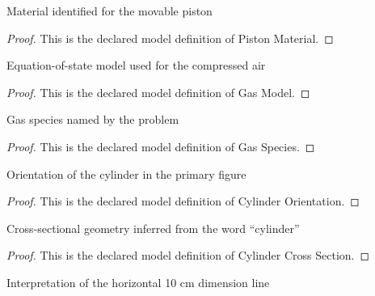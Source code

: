 \begin{definition}
  \label{def:physics:phyx-mini-0374:phyxminiproblems-problemphyxmini0374-pistonmaterial}
  Material identified for the movable piston
\end{definition}
\begin{proof}
  This is the declared model definition of Piston Material.
\end{proof}
\begin{definition}
  \label{def:physics:phyx-mini-0374:phyxminiproblems-problemphyxmini0374-gasmodel}
  Equation-of-state model used for the compressed air
\end{definition}
\begin{proof}
  This is the declared model definition of Gas Model.
\end{proof}
\begin{definition}
  \label{def:physics:phyx-mini-0374:phyxminiproblems-problemphyxmini0374-gasspecies}
  Gas species named by the problem
\end{definition}
\begin{proof}
  This is the declared model definition of Gas Species.
\end{proof}
\begin{definition}
  \label{def:physics:phyx-mini-0374:phyxminiproblems-problemphyxmini0374-cylinderorientation}
  Orientation of the cylinder in the primary figure
\end{definition}
\begin{proof}
  This is the declared model definition of Cylinder Orientation.
\end{proof}
\begin{definition}
  \label{def:physics:phyx-mini-0374:phyxminiproblems-problemphyxmini0374-cylindercrosssection}
  Cross-sectional geometry inferred from the word “cylinder”
\end{definition}
\begin{proof}
  This is the declared model definition of Cylinder Cross Section.
\end{proof}
\begin{definition}
  \label{def:physics:phyx-mini-0374:phyxminiproblems-problemphyxmini0374-widthinterpretation}
  Interpretation of the horizontal 10 cm dimension line
\end{definition}
